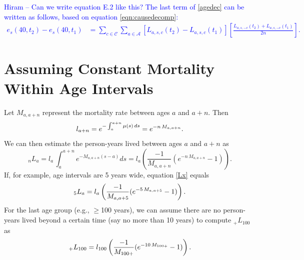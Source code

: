 \documentclass[11pt,letterpaper]{article}
\theoremstyle{plain}
\theoremstyle{remark}
\numberwithin{equation}{section}
\begin{document}
\textcolor{blue}{Hiram -- Can we write equation E.2 like this?  The last term of \eqref{agedec} can be written as follows, based
on equation \eqref{eqn:causedecomp}:
\begin{align}
  e_s(40,t_2)-e_s(40,t_1)&=\sum_{c\in\mathcal{C}} \sum_{a\in\mathcal{A}}\left[L_{a,s,c}(t_2)-L_{a,s,c}(t_1) \right] \left[\frac{L_{a,s,-c}(t_2)+L_{a,s,-c}(t_1) }{2n} \right] .
\end{align}}
\section{Assuming Constant Mortality Within Age Intervals}
Let $M_{a,a+n}$ represent the mortality rate between ages $a$ and
$a+n$. Then
\begin{equation}
l_{a+n}=e^{-\int_a^{a+n}\mu(s)\,ds}=e^{-n\,M_{a,a+n}}.\notag
\end{equation}
We can then estimate the person-years lived between ages $a$ and $a+n$
as
\begin{equation}
_nL_{a}=l_a\,\int_a^{a+n} e^{-M_{a,a+n}(s-a)} ds=l_a \left(\frac{-1}{M_{a,a+n}}(e^{-n\,M_{a,a+n}}-1) \right).
\label{Lx}
\end{equation}
If, for example, age intervals are 5 years wide, equation \eqref{Lx}
equals
\begin{equation}
_5L_{a}=l_a \left(\frac{-1}{M_{a,a+5}}(e^{-5\,M_{a,a+5}}-1) \right).\notag
\end{equation}
For the last age group (e.g., $\geq$100 years), we can assume there
are no person-years lived beyond a certain time (say no more than 10
years) to compute $_+L_{100}$ as
\begin{equation}
_+L_{100}=l_{100} \left(\frac{-1}{M_{100+}}(e^{-10\,M_{100+}}-1) \right).\notag
\end{equation}

\end{document}
